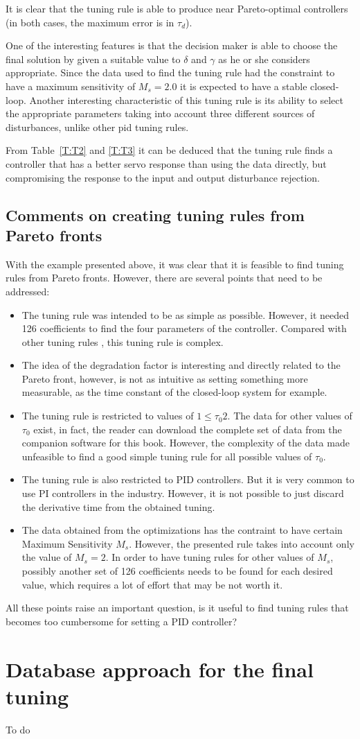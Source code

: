 It is clear that the tuning rule is able to produce near Pareto-optimal controllers (in both cases, the maximum error is in $\tau_d$).

One of the interesting features is that the decision maker is able to choose the final solution by given a suitable value to $\delta$ and $\gamma$ as he or she considers appropriate. Since the data used to find the tuning rule had the constraint to have a maximum sensitivity of $M_s =2.0$ it is expected to have a stable closed-loop. Another interesting characteristic of this tuning rule is its ability to select the appropriate parameters taking into account three different sources of disturbances, unlike other \gls{pid} tuning rules.

From Table~\ref{T:T2} and \ref{T:T3} it can be deduced that the tuning rule finds a controller that has a better servo response than using the data directly, but compromising the response to the input and output disturbance rejection.

\subsection{Comments on creating tuning rules from Pareto fronts}
\label{sec:TuningRules}
With the example presented above, it was clear that it is feasible to find tuning rules from Pareto fronts. However, there are several points that need to be addressed:
\begin{itemize}
	\item The tuning rule was intended to be as simple as possible. However, it needed 126 coefficients to find the four parameters of the controller. Compared with other tuning rules \cite{odwyer2006}, this tuning rule is complex.
	\item The idea of the degradation factor is interesting and directly related to the Pareto front, however, is not as intuitive as setting something more measurable, as the time constant of the closed-loop system for example.
	\item The tuning rule is restricted to values of $1 \leq \tau_0 2$. The data for other values of $\tau_0$ exist, in fact, the reader can download the complete set of data from the companion software for this book. However, the complexity of the data made unfeasible to find a good simple tuning rule for all possible values of $\tau_0$.
	\item The tuning rule is also restricted to PID controllers. But it is very common to use PI controllers in the industry. However, it is not possible to just discard the derivative time from the obtained tuning.
	\item The data obtained from the optimizations has the contraint to have certain Maximum Sensitivity $M_s$. However, the presented rule takes into account only the value of $M_s = 2$. In order to have tuning rules for other values of $M_s$, possibly another set of 126 coefficients needs to be found for each desired value, which requires a lot of effort that may be not worth it.
\end{itemize}

All these points raise an important question, is it useful to find tuning rules that becomes too cumbersome for setting a PID controller?
%
\section{Database approach for the final tuning}
\label{sec:DatabaseMOOP}
To do
%